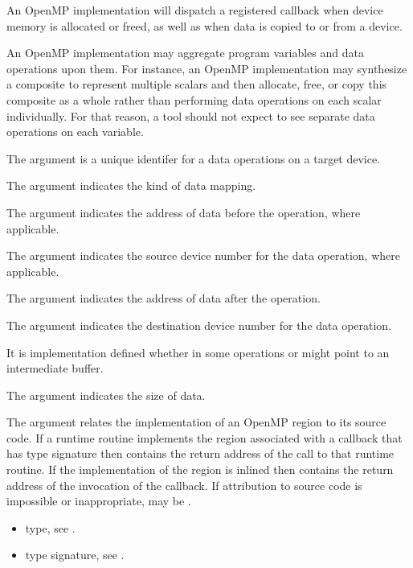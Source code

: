 \descr
An OpenMP implementation will dispatch a registered  callback
when device memory is allocated or freed, as well as when data is copied to or from a device.

\begin{note}
An OpenMP implementation may aggregate program variables and data
operations upon them.  For instance, an OpenMP implementation may
synthesize a composite to represent multiple scalars and then
allocate, free, or copy this composite as a whole rather than
performing data operations on each scalar individually.  For that
reason, a tool should not expect to see separate data operations
on each variable.
\end{note}

\argdesc

The argument  is a unique identifer for a data
operations on a target device.

The argument  indicates the kind of data mapping.

The argument  indicates the address of data
before the operation, where applicable.

The argument  indicates the source device number
for the data operation, where applicable.

The argument  indicates the address of data
after the operation.

The argument  indicates the destination device
number for the data operation.

It is implementation defined whether in some operations 
or  might point to an intermediate buffer.

The argument  indicates the size of data.

The  argument relates the implementation of an OpenMP region
to its source code. If a runtime routine implements the region associated with
a callback that has type signature  then
 contains the return address of the call to that runtime routine.
If the implementation of the region is inlined then  contains the
return address of the invocation of the callback. If attribution to source code
is impossible or inappropriate, may be .

\crossreferences
\begin{itemize}
\item {} type, see
.
\item {} type signature, see
.
\end{itemize}




